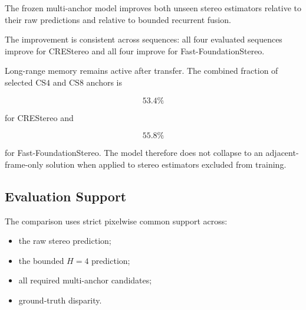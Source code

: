 \documentclass[11pt,a4paper]{article}
\begin{document}
\begin{table}[t]
\centering
\caption{
Same-domain transfer to stereo estimators excluded from temporal-refiner
training. Results use strict common support across the raw prediction,
bounded \(H=4\) refiner, and immutable multi-anchor refiner.
Lower EPE is better.
}
\label{tab:unseen_multi_anchor}
\end{table}

The frozen multi-anchor model improves both unseen stereo estimators
relative to their raw predictions and relative to bounded recurrent
fusion.

The improvement is consistent across sequences:
all four evaluated sequences improve for CREStereo and all four improve
for Fast-FoundationStereo.

Long-range memory remains active after transfer.
The combined fraction of selected \(\mathrm{CS4}\) and \(\mathrm{CS8}\)
anchors is

\begin{equation}
53.4\%
\end{equation}

for CREStereo and

\begin{equation}
55.8\%
\end{equation}

for Fast-FoundationStereo.
The model therefore does not collapse to an adjacent-frame-only
solution when applied to stereo estimators excluded from training.

\subsection{Evaluation Support}

The comparison uses strict pixelwise common support across:

\begin{itemize}
    \item the raw stereo prediction;
    \item the bounded \(H=4\) prediction;
    \item all required multi-anchor candidates;
    \item ground-truth disparity.
\end{itemize}
\end{document}
